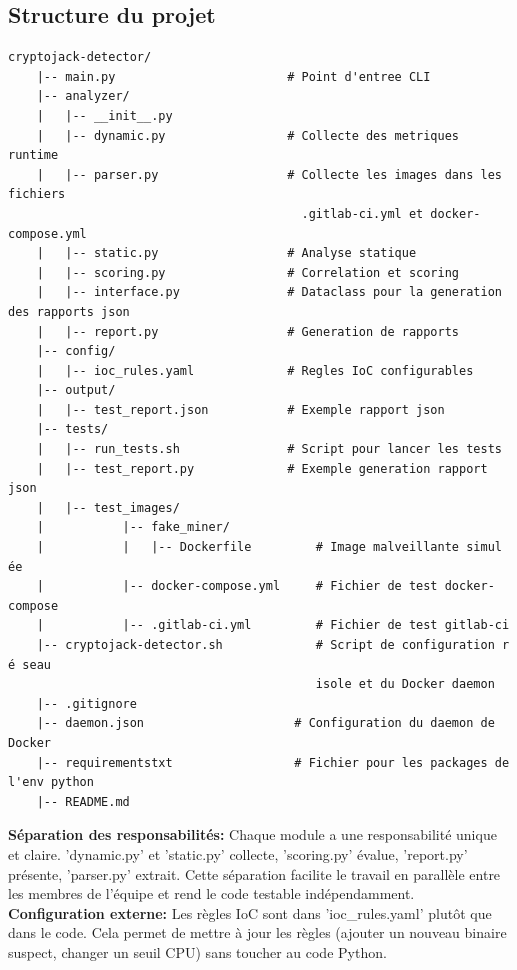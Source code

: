 \subsection{Structure du projet}
\begin{lstlisting}[caption=Structure du projet]
    cryptojack-detector/
    |-- main.py                        # Point d'entree CLI
    |-- analyzer/
    |   |-- __init__.py
    |   |-- dynamic.py                 # Collecte des metriques runtime
    |   |-- parser.py                  # Collecte les images dans les fichiers 
                                         .gitlab-ci.yml et docker-compose.yml
    |   |-- static.py                  # Analyse statique
    |   |-- scoring.py                 # Correlation et scoring
    |   |-- interface.py               # Dataclass pour la generation des rapports json
    |   |-- report.py                  # Generation de rapports
    |-- config/
    |   |-- ioc_rules.yaml             # Regles IoC configurables
    |-- output/
    |   |-- test_report.json           # Exemple rapport json
    |-- tests/
    |   |-- run_tests.sh               # Script pour lancer les tests
    |   |-- test_report.py             # Exemple generation rapport json
    |   |-- test_images/
    |           |-- fake_miner/
    |           |   |-- Dockerfile         # Image malveillante simul ée
    |           |-- docker-compose.yml     # Fichier de test docker-compose
    |           |-- .gitlab-ci.yml         # Fichier de test gitlab-ci
    |-- cryptojack-detector.sh             # Script de configuration r é seau
                                           isole et du Docker daemon
    |-- .gitignore
    |-- daemon.json                     # Configuration du daemon de Docker
    |-- requirementstxt                 # Fichier pour les packages de l'env python
    |-- README.md

\end{lstlisting}

\textbf{Séparation des responsabilités:}
Chaque module a une responsabilité unique et claire. 'dynamic.py' et 'static.py' collecte, 'scoring.py' évalue, 'report.py' présente, 'parser.py' extrait. Cette séparation facilite le travail en parallèle entre les membres de l'équipe et rend le code testable indépendamment. \\

\textbf{Configuration externe:}
Les règles IoC sont dans 'ioc\_rules.yaml' plutôt que dans le code. Cela permet de mettre à jour les règles (ajouter un nouveau binaire suspect, changer un seuil CPU) sans toucher au code Python. \\

